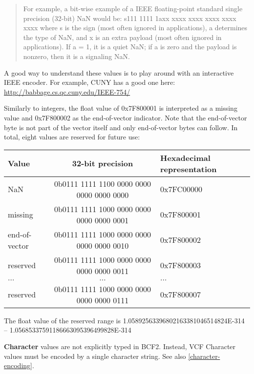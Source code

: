 \documentclass[8pt]{article}
\begin{document}
\begin{quote}
For example, a bit-wise example of a IEEE floating-point standard single
precision (32-bit) NaN would be: s111 1111 1axx xxxx xxxx xxxx xxxx xxxx where
s is the sign (most often ignored in applications), a determines the type of
NaN, and x is an extra payload (most often ignored in applications).  If a = 1,
it is a quiet NaN; if a is zero and the payload is nonzero, then it is a
signaling NaN.
\end{quote}

\noindent A good way to understand these values is to play around with an interactive IEEE encoder.
For example, CUNY has a good one here: \href{http://babbage.cs.qc.cuny.edu/IEEE-754/}{http://babbage.cs.qc.cuny.edu/IEEE-754/}

\vspace{0.3cm}
\noindent Similarly to integers, the float value of 0x7F800001 is interpreted as a missing value
and 0x7F800002 as the end-of-vector indicator. Note that the end-of-vector byte
is not part of the vector itself and only end-of-vector bytes can follow. In total,
eight values are reserved for future use:

\vspace{0.1cm}
\begin{tabular}{| l | c | l |} \hline
\textbf{Value}   & \textbf{32-bit precision} & \textbf{Hexadecimal representation} \\ \hline
NaN	    & 0b0111 1111 1100 0000 0000 0000 0000 0000 & 0x7FC00000 \\ \hline
missing & 0b0111 1111 1000 0000 0000 0000 0000 0001 & 0x7F800001 \\ \hline
end-of-vector & 0b0111 1111 1000 0000 0000 0000 0000 0010 & 0x7F800002 \\ \hline
reserved & 0b0111 1111 1000 0000 0000 0000 0000 0011 & 0x7F800003 \\ \hline
$\ldots$ & $\ldots$ & $\ldots$ \\ \hline
reserved & 0b0111 1111 1000 0000 0000 0000 0000 0111 & 0x7F800007 \\ \hline
\end{tabular}
The float value of the reserved range is 1.05892563396802163381046514824E-314 -- 1.05685337591186663095396499828E-314

\vspace{0.3cm}
\textbf{Character} values are not explicitly typed in BCF2.  Instead, VCF Character values must be encoded by a single character string. See also \ref{character-encoding}.
\end{document}

